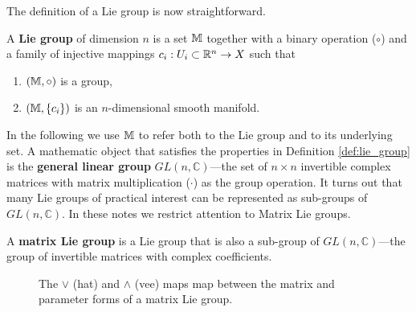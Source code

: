 
The definition of a Lie group is now straightforward.

\begin{important}
  \begin{definition}
    \label{def:lie_group}
    A \textbf{Lie group} of dimension $n$ is a set $\mathbb{M}$ together with a binary operation ($\circ$) and a family of injective mappings $c_i : U_i \subset \mathbb{R}^n \rightarrow X$ such that
    \begin{enumerate}
      \item $(\mathbb{M}, \circ)$ is a group,
      \item $(\mathbb{M}, \{ c_i \})$ is an $n$-dimensional smooth manifold.
    \end{enumerate}
  \end{definition}
\end{important}

In the following we use $\mathbb{M}$ to refer both to the Lie group and to its underlying set. A mathematic object that satisfies the properties in Definition \ref{def:lie_group} is the \textbf{general linear group} $GL(n, \mathbb{C})$---the set of $n \times n$ invertible complex matrices with matrix multiplication ($\cdot$) as the group operation. It turns out that many Lie groups of practical interest can be represented as sub-groups of $GL(n, \mathbb{C})$. In these notes we restrict attention to Matrix Lie groups.

\begin{definition}
  A \textbf{matrix Lie group} is a Lie group that is also a sub-group of $GL(n, \mathbb{C})$---the group of invertible matrices with complex coefficients.
\end{definition}

\begin{figure}
  \begin{center}
  \end{center}
  \caption{The $\vee$ (hat) and $\wedge$ (vee) maps map between the matrix and parameter forms of a matrix Lie group.}
\end{figure}


